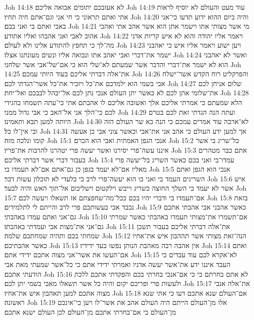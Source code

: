 Joh 14:18  לא אעזבכם יתומים אבואה אליכם׃
Joh 14:19  עוד מעט והעולם לא יוסיף לראות אתי ואתם תראוני כי חי אני וגם־אתם חיה תחיו׃
Joh 14:20  והיה ביום ההוא ידוע תדעו כי־אני באבי ואתם בי ואני בכם׃
Joh 14:21  מי אשר מצותי אתו וישמר אתן הוא אשר אהב אתי ואהבי אהוב לאבי ואני אהבהו ואליו אתודע׃
Joh 14:22  ויאמר אליו יהודה והוא לא איש קריות אדני מה־לך כי תחפץ להתודע אלינו ולא לעולם׃
Joh 14:23  ויען ישוע ויאמר אליו איש כי יאהבני ישמר את־דברי ואבי יאהב אתו ונבואה אליו ונשים מעונתנו אצלו׃
Joh 14:24  ואשר לא יאהבני הוא לא ישמר את־דברי והדבר אשר שמעתם לא־שלי הוא כי אם־של־אבי אשר שלחני׃
Joh 14:25  את־אלה דברתי אליכם בעוד היותי עמכם׃
Joh 14:26  והפרקליט רוח הקדש אשר־ישלח אבי בשמי הוא ילמדכם את־כל ויזכיר את־כל אשר־הגדתי לכם׃
Joh 14:27  שלום אניחן לכם את־שלומי אתן לכם לא כאשר יתן העולם אנכי נתן לכם אל־יבהל לבבכם ואל־יחת׃
Joh 14:28  הלא שמעתם כי אמרתי אליכם אלך ואשובה אליכם לו אהבתם אתי כי־עתה תשמחו בהגידי לכם כי־הלך אני אל־האב כי אבי גדול ממני׃
Joh 14:29  ועתה הנה הגדתי זאת לכם בטרם היותה למען תבא ותאמינו׃
Joh 14:30  לא־ארבה עוד אמרים עמכם כי הנה בא שר העולם הזה ובי אין־לו כל׃
Joh 14:31  אך למען ידע העולם כי אהב אני את־אבי וכאשר צוני אבי כן אעשה קומו ונלכה מזה׃
Joh 15:1  אנכי הגפן האמתית ואבי הוא הכרם׃
Joh 15:2  כל־שריג בי אשר איננו עשה־פרי יסירנו ואשר יעשה פרי יטהרנו להרבות את־פריו׃
Joh 15:3  אתם כבר מטהרים בעבור דברי אשר דברתי אליכם׃
Joh 15:4  עמדו־בי ואני בכם כאשר השריג בל־יעשה פרי מאליו אם־לא יעמד בגפן כן גם־אתם אם־לא תעמדו בי׃
Joh 15:5  אנכי הוא הגפן ואתם השריגים העמד בי ואני בו הוא יעשה־פרי לרב כי בלעדי לא תוכלון עשות דבר׃
Joh 15:6  איש אשר לא יעמד בי השלך החוצה כשריג וייבש וילקטום וישליכום אל־תוך האש והיה לבער׃
Joh 15:7  אם־תעמדו בי ודברי יהיו בכם ככל־מה־שחפצתם אז תשאלו ויעשה לכם׃
Joh 15:8  בזאת נכבד אבי בעשותכם פרי לרב והייתם לי לתלמידים׃
Joh 15:9  כאשר אהבני אבי אהבתי אתכם גם־אני ואתם עמדו באהבתי׃
Joh 15:10  אם־תשמרו את־מצותי תעמדו באהבתי כאשר שמרתי גם־אני את־מצות אבי ועמדתי באהבתו׃
Joh 15:11  את־אלה דברתי אליכם בעבור תשכן שמחתי בכם ותהיה שמחתכם שלמה׃
Joh 15:12  הנה־זאת מצותי אשר תההבון איש את־אחיו כאשר אהבתיכם׃
Joh 15:13  אין אהבה רבה מאהבת הנותן נפשו בעד ידידיו׃
Joh 15:14  ואתם אם־תעשו את אשר־אני מצוה אתכם ידידי אתם׃
Joh 15:15  לא־אקרא לכם עוד עבדים כי העבד איננו ידע את־אשר יעשה אדניו ואמרתי ידידי אתם כי כל־אשר שמעתי מאת אבי הודעתי אתכם׃
Joh 15:16  לא אתם בחרתם בי כי אם־אנכי בחרתי בכם והפקדתי אתכם ללכת ולעשות פרי ופריכם יקום והיה כל אשר תשאלו מאבי בשמי יתן לכם׃
Joh 15:17  את־אלה אנכי מצוה אתכם למען תאהבון איש את־אחיו׃
Joh 15:18  אם־העולם שנא אתכם דעו כי אתי שנא ראשונה׃
Joh 15:19  אלו מן־העולם הייתם היה העולם אהב את אשר־לו ויען כי־אינכם מן־העולם כי אם־בחרתי אתכם מן־העולם לכן העולם ישנא אתכם׃

